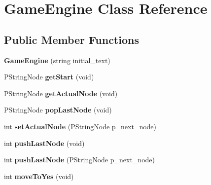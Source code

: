 \hypertarget{classGameEngine}{}\section{Game\+Engine Class Reference}
\label{classGameEngine}
\subsection*{Public Member Functions}
\begin{DoxyCompactItemize}
\item 
{\bfseries Game\+Engine} (string initial\+\_\+text)\hypertarget{classGameEngine_a61a8e7428298785176db2cc23436d4c1}{}\label{classGameEngine_a61a8e7428298785176db2cc23436d4c1}

\item 
P\+String\+Node {\bfseries get\+Start} (void)\hypertarget{classGameEngine_a921086c9cc040a04b58ab43ca1993b8a}{}\label{classGameEngine_a921086c9cc040a04b58ab43ca1993b8a}

\item 
P\+String\+Node {\bfseries get\+Actual\+Node} (void)\hypertarget{classGameEngine_a12de523ffd3267f652e8834e680bac14}{}\label{classGameEngine_a12de523ffd3267f652e8834e680bac14}

\item 
P\+String\+Node {\bfseries pop\+Last\+Node} (void)\hypertarget{classGameEngine_acadf06a46e5bd271a7be462bbac559a3}{}\label{classGameEngine_acadf06a46e5bd271a7be462bbac559a3}

\item 
int {\bfseries set\+Actual\+Node} (P\+String\+Node p\+\_\+next\+\_\+node)\hypertarget{classGameEngine_ae0ea93bfa7e03359bfca6851aac0f79c}{}\label{classGameEngine_ae0ea93bfa7e03359bfca6851aac0f79c}

\item 
int {\bfseries push\+Last\+Node} (void)\hypertarget{classGameEngine_a0ccf9ba8728a8f4b699f95803f05089f}{}\label{classGameEngine_a0ccf9ba8728a8f4b699f95803f05089f}

\item 
int {\bfseries push\+Last\+Node} (P\+String\+Node p\+\_\+next\+\_\+node)\hypertarget{classGameEngine_a599023dd006f5f19b8793dde54806d37}{}\label{classGameEngine_a599023dd006f5f19b8793dde54806d37}

\item 
int {\bfseries move\+To\+Yes} (void)\hypertarget{classGameEngine_abdba822c3e78d637d47395dc616b363e}{}\label{classGameEngine_abdba822c3e78d637d47395dc616b363e}


\end{DoxyCompactItemize}
